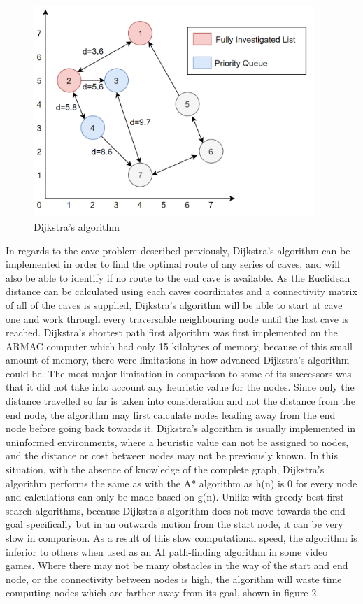 \documentclass[12pt, a4paper]{article}
\begin{document}
    \begin{figure}[!htb]
    \centering
    \includegraphics[height=8cm]{d.png}
    \caption{Dijkstra's algorithm} \label{fig1}
    \end{figure}
    
    In regards to the cave problem described previously, Dijkstra's algorithm can be implemented in order to find the optimal route of any series of caves, and will also be able to identify if no route  to the end cave is available. As the Euclidean distance can be calculated using each caves coordinates and a connectivity matrix of all of the caves is supplied, Dijkstra's algorithm will be able to start at cave one and work through every traversable neighbouring node until the last cave is reached.
    Dijkstra's shortest path first algorithm was first implemented on the ARMAC computer which had only 15 kilobytes of memory, because of this small amount of memory, there were limitations in how advanced Dijkstra's algorithm could be. The most major limitation in comparison to some of its successors was that it did not take into account any heuristic value for the nodes. 
\newpage
Since only the distance travelled so far is taken into consideration and not the distance from the end node, the algorithm may first calculate nodes leading away from the end node before going back towards it.
    Dijkstra's algorithm is usually implemented in uninformed environments, where a heuristic value can not be assigned to nodes, and the distance or cost between nodes may not be previously known. In this situation, with the absence of knowledge of the complete graph, Dijkstra's algorithm performs the same as with the A* algorithm as h(n) is 0 for every node and calculations can only be made based on g(n).
    Unlike with greedy best-first-search algorithms, because Dijkstra's algorithm does not move towards the end goal specifically but in an outwards motion from the start node, it can be very slow in comparison. As a result of this slow computational speed, the algorithm is inferior to others when used as an AI path-finding algorithm in some video games. Where there may not be many obstacles in the way of the start and end node, or the connectivity between nodes is high, the algorithm will waste time computing nodes which are farther away from its goal, shown in figure 2.
\end{document}
